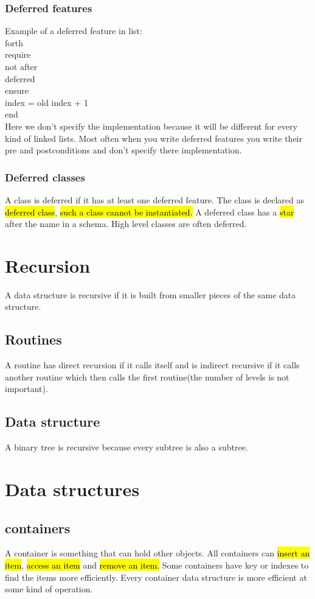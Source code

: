 \documentclass[11pt]{article}
\newcommand\tab[1][1cm]{\hspace*{#1}}
\begin{document}
\subsubsection{Deferred features}
Example of a deferred feature in list:\\forth\\\tab require\\\tab\tab not after\\\tab deferred\\\tab ensure\\\tab\tab index = old index + 1\\\tab end\\Here we don't specify the implementation because it will be different for every kind of linked lists. Most often when you write deferred features you write their pre and postconditions and don't specify there implementation.
\subsubsection{Deferred classes}
A class is deferred if it has at least one deferred feature. The class is declared as \hl{deferred class}, \hl{such a class cannot be instantiated.} A deferred class has a \hl{star} after the name in a schema. High level classes are often deferred.
\section{Recursion}
A data structure is recursive if it is built from smaller pieces of the same data structure.
\subsection{Routines}
A routine has direct recursion if it calls itself and is indirect recursive if it calls another routine which then calls the first routine(the number of levels is not important).
\subsection{Data structure}
A binary tree is recursive because every subtree is also a subtree.
\section{Data structures}
\subsection{containers}
A container is something that can hold other objects. All containers can \hl{insert an item}, \hl{access an item} and \hl{remove an item.} Some containers have key or indexes to find the items more efficiently. Every container data structure is more efficient at some kind of operation.
\end{document}

